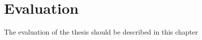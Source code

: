 \chapter{Evaluation}
\label{cha:evaluation}

The evaluation of the thesis should be described in this chapter